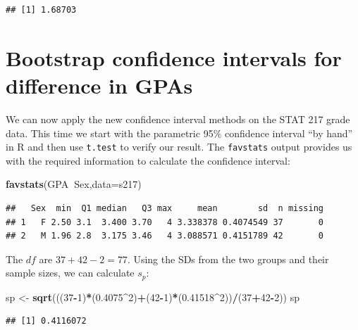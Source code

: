 \documentclass[]{book}
\newenvironment{Shaded}{\begin{snugshade}}{\end{snugshade}}
\newcommand{\KeywordTok}[1]{\textcolor[rgb]{0.13,0.29,0.53}{\textbf{#1}}}
\newcommand{\DataTypeTok}[1]{\textcolor[rgb]{0.13,0.29,0.53}{#1}}
\newcommand{\DecValTok}[1]{\textcolor[rgb]{0.00,0.00,0.81}{#1}}
\newcommand{\FloatTok}[1]{\textcolor[rgb]{0.00,0.00,0.81}{#1}}
\newcommand{\StringTok}[1]{\textcolor[rgb]{0.31,0.60,0.02}{#1}}
\newcommand{\OperatorTok}[1]{\textcolor[rgb]{0.81,0.36,0.00}{\textbf{#1}}}
\newcommand{\NormalTok}[1]{#1}
\begin{document}
\begin{verbatim}
## [1] 1.68703
\end{verbatim}

\section{Bootstrap confidence intervals for difference in
GPAs}\label{section2-9}

We can now apply the new confidence interval methods on the STAT 217
grade data. This time we start with the parametric 95\% confidence
interval ``by hand'' in R and then use \texttt{t.test} to verify our
result. The \texttt{favstats} output provides us with the required
information to calculate the confidence interval:

\begin{Shaded}
\begin{Highlighting}[]
\KeywordTok{favstats}\NormalTok{(GPA}\OperatorTok{~}\NormalTok{Sex,}\DataTypeTok{data=}\NormalTok{s217)}
\end{Highlighting}
\end{Shaded}

\begin{verbatim}
##   Sex  min  Q1 median   Q3 max     mean        sd  n missing
## 1   F 2.50 3.1  3.400 3.70   4 3.338378 0.4074549 37       0
## 2   M 1.96 2.8  3.175 3.46   4 3.088571 0.4151789 42       0
\end{verbatim}

The \(df\) are \(37+42-2 = 77\). Using the SDs from the two groups and
their sample sizes, we can calculate \(s_p\):

\begin{Shaded}
\begin{Highlighting}[]
\NormalTok{sp <-}\StringTok{ }\KeywordTok{sqrt}\NormalTok{(((}\DecValTok{37}\OperatorTok{-}\DecValTok{1}\NormalTok{)}\OperatorTok{*}\NormalTok{(}\FloatTok{0.4075}\OperatorTok{^}\DecValTok{2}\NormalTok{)}\OperatorTok{+}\NormalTok{(}\DecValTok{42}\OperatorTok{-}\DecValTok{1}\NormalTok{)}\OperatorTok{*}\NormalTok{(}\FloatTok{0.41518}\OperatorTok{^}\DecValTok{2}\NormalTok{))}\OperatorTok{/}\NormalTok{(}\DecValTok{37}\OperatorTok{+}\DecValTok{42}\OperatorTok{-}\DecValTok{2}\NormalTok{))}
\NormalTok{sp}
\end{Highlighting}
\end{Shaded}

\begin{verbatim}
## [1] 0.4116072
\end{verbatim}
\end{document}
